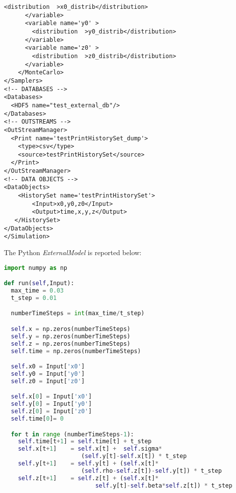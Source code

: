 \begin{lstlisting}[style=XML,morekeywords={debug,re,seeding,class,subType,limit}]
        <distribution  >x0_distrib</distribution>
      </variable>
      <variable name='y0' >
        <distribution  >y0_distrib</distribution>
      </variable>
      <variable name='z0' >
        <distribution  >z0_distrib</distribution>
      </variable>
    </MonteCarlo>
</Samplers>
<!-- DATABASES -->
<Databases>
  <HDF5 name="test_external_db"/>
</Databases>
<!-- OUTSTREAMS -->
<OutStreamManager>
  <Print name='testPrintHistorySet_dump'>
    <type>csv</type>
    <source>testPrintHistorySet</source>
  </Print>
</OutStreamManager>
<!-- DATA OBJECTS -->
<DataObjects>
    <HistorySet name='testPrintHistorySet'>
        <Input>x0,y0,z0</Input>
        <Output>time,x,y,z</Output>
   </HistorySet>
</DataObjects>
</Simulation>
\end{lstlisting}
The Python \textit{ExternalModel} is reported below:
\begin{lstlisting}[language=python]
import numpy as np

def run(self,Input):
  max_time = 0.03
  t_step = 0.01

  numberTimeSteps = int(max_time/t_step)

  self.x = np.zeros(numberTimeSteps)
  self.y = np.zeros(numberTimeSteps)
  self.z = np.zeros(numberTimeSteps)
  self.time = np.zeros(numberTimeSteps)

  self.x0 = Input['x0']
  self.y0 = Input['y0']
  self.z0 = Input['z0']

  self.x[0] = Input['x0']
  self.y[0] = Input['y0']
  self.z[0] = Input['z0']
  self.time[0]= 0

  for t in range (numberTimeSteps-1):
    self.time[t+1] = self.time[t] + t_step
    self.x[t+1]    = self.x[t] +  self.sigma*
                      (self.y[t]-self.x[t]) * t_step
    self.y[t+1]    = self.y[t] + (self.x[t]*
                      (self.rho-self.z[t])-self.y[t]) * t_step
    self.z[t+1]    = self.z[t] + (self.x[t]*
                          self.y[t]-self.beta*self.z[t]) * t_step
\end{lstlisting}

